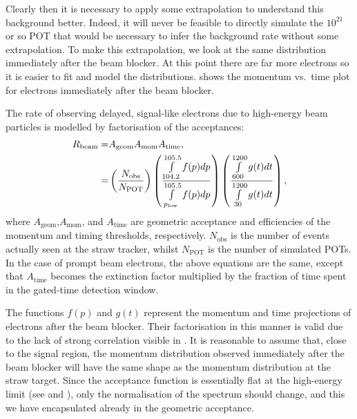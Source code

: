 Clearly then it is necessary to apply some extrapolation to understand this background better.
Indeed, it will never be feasible to directly simulate the $10^{21}$ or so POT that would be necessary to infer the background rate without some extrapolation.
To make this extrapolation, we look at the same distribution immediately after the beam blocker.  
At this point there are far more electrons so it is easier to fit and model the distributions.
 shows the momentum vs.\ time plot for electrons immediately after the beam blocker.

The rate of observing delayed, signal-like electrons due to high-energy beam particles is modelled by factorisation of the acceptances:
\begin{align}
R_\mathrm{beam}=&A_\textrm{geom}A_\textrm{mom}A_\textrm{time},\\
=&\left(\frac{N_\textrm{obs}}{N_\textrm{POT}}\right)\left(\frac{\int\limits_{104.2}^{105.5}f(p)dp}{\int\limits_{p_\textrm{low}}^{105.5}f(p)dp}\right)\left(\frac{\int\limits_{600}^{1200}g(t)dt}{\int\limits_{30}^{1200}g(t)dt}\right),
\eqlabel{bg:beam:factors}
\end{align}
where $A_\textrm{geom}$,$A_\textrm{mom}$, and $A_\textrm{time}$ are geometric acceptance and efficiencies of the momentum and timing thresholds, respectively.
$N_\textrm{obs}$ is the number of events actually seen at the straw tracker, whilst $N_\textrm{POT}$ is the number of simulated \acp{POT}.
In the case of prompt beam electrons, the above equations are the same, except that $A_\textrm{time}$ becomes the extinction factor multiplied by the fraction of time spent in the gated-time detection window.
\FigBgBeamExtrapolate

The functions $f(p)$ and $g(t)$ represent the momentum and time projections of electrons after the beam blocker. 
Their factorisation in this manner is valid due to the lack of strong correlation visible in .
It is reasonable to assume that, close to the signal region, the momentum distribution observed immediately after the beam blocker will have the same shape as the momentum distribution at the straw target.
Since the acceptance function is essentially flat at the high-energy limit (see  and ), only the normalisation of the spectrum should change, and this we have encapsulated already in the geometric acceptance.

